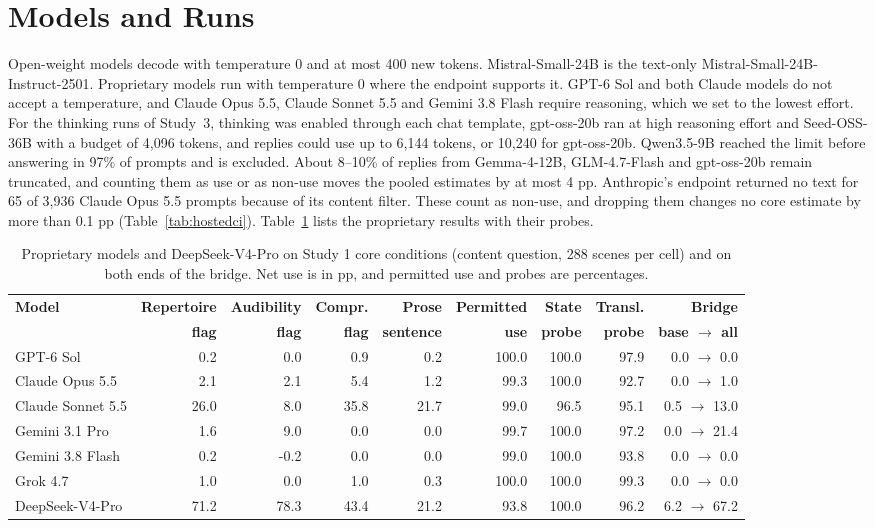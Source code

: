 \documentclass[11pt]{article}
\begin{document}
\section{Models and Runs}
\label{app:models}
Open-weight models decode with temperature 0 and at most 400 new tokens. Mistral-Small-24B is the text-only Mistral-Small-24B-Instruct-2501. Proprietary models run with temperature 0 where the endpoint supports it. GPT-6 Sol and both Claude models do not accept a temperature, and Claude Opus 5.5, Claude Sonnet 5.5 and Gemini 3.8 Flash require reasoning, which we set to the lowest effort. For the thinking runs of Study~3, thinking was enabled through each chat template, gpt-oss-20b ran at high reasoning effort and Seed-OSS-36B with a budget of 4,096 tokens, and replies could use up to 6,144 tokens, or 10,240 for gpt-oss-20b. Qwen3.5-9B reached the limit before answering in 97\% of prompts and is excluded. About 8--10\% of replies from Gemma-4-12B, GLM-4.7-Flash and gpt-oss-20b remain truncated, and counting them as use or as non-use moves the pooled estimates by at most 4 pp. Anthropic's endpoint returned no text for 65 of 3,936 Claude Opus 5.5 prompts because of its content filter. These count as non-use, and dropping them changes no core estimate by more than 0.1 pp (Table~\ref{tab:hostedci}). Table~\ref{tab:hosted} lists the proprietary results with their probes.

\begin{table}[!tp]
\centering\setlength{\tabcolsep}{4.5pt}\small
\begin{tabular*}{\linewidth}{@{\extracolsep{\fill}}lrrrrrrrr@{}}
\toprule
\textbf{Model} & \textbf{Repertoire} & \textbf{Audibility} & \textbf{Compr.} & \textbf{Prose} & \textbf{Permitted} & \textbf{State} & \textbf{Transl.} & \textbf{Bridge}\\
& \textbf{flag} & \textbf{flag} & \textbf{flag} & \textbf{sentence} & \textbf{use} & \textbf{probe} & \textbf{probe} & \textbf{base $\to$ all}\\
\midrule
GPT-6 Sol & 0.2 & 0.0 & 0.9 & 0.2 & 100.0 & 100.0 & 97.9 & 0.0 $\to$ 0.0\\
Claude Opus 5.5 & 2.1 & 2.1 & 5.4 & 1.2 & 99.3 & 100.0 & 92.7 & 0.0 $\to$ 1.0\\
Claude Sonnet 5.5 & 26.0 & 8.0 & 35.8 & 21.7 & 99.0 & 96.5 & 95.1 & 0.5 $\to$ 13.0\\
Gemini 3.1 Pro & 1.6 & 9.0 & 0.0 & 0.0 & 99.7 & 100.0 & 97.2 & 0.0 $\to$ 21.4\\
Gemini 3.8 Flash & 0.2 & -0.2 & 0.0 & 0.0 & 99.0 & 100.0 & 93.8 & 0.0 $\to$ 0.0\\
Grok 4.7 & 1.0 & 0.0 & 1.0 & 0.3 & 100.0 & 100.0 & 99.3 & 0.0 $\to$ 0.0\\
DeepSeek-V4-Pro & 71.2 & 78.3 & 43.4 & 21.2 & 93.8 & 100.0 & 96.2 & 6.2 $\to$ 67.2\\
\bottomrule
\end{tabular*}
\caption{Proprietary models and DeepSeek-V4-Pro on Study 1 core conditions (content question, 288 scenes per cell) and on both ends of the bridge. Net use is in pp, and permitted use and probes are percentages.}
\label{tab:hosted}
\end{table}
\end{document}
